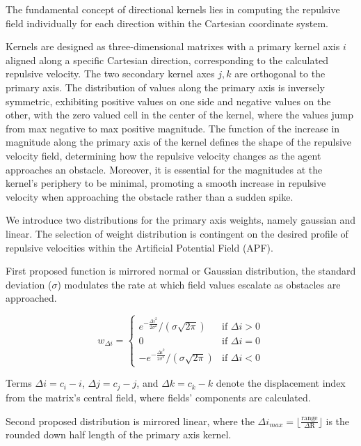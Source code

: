 \documentclass[letterpaper, 10 pt, conference]{ieeeconf}  %
\begin{document}
The fundamental concept of directional kernels lies in computing the repulsive field individually for each direction within the Cartesian coordinate system. 

Kernels are designed as three-dimensional matrixes with a primary kernel axis $i$ aligned along a specific Cartesian direction, corresponding to the calculated repulsive velocity. The two secondary kernel axes $j,k$ are orthogonal to the primary axis. The distribution of values along the primary axis is inversely symmetric, exhibiting positive values on one side and negative values on the other, with the zero valued cell in the center of the kernel, where the values jump from max negative to max positive magnitude. The function of the increase in magnitude along the primary axis of the kernel defines the shape of the repulsive velocity field, determining how the repulsive velocity changes as the agent approaches an obstacle. Moreover, it is essential for the magnitudes at the kernel's periphery to be minimal, promoting a smooth increase in repulsive velocity when approaching the obstacle rather than a sudden spike.

We introduce two distributions for the primary axis weights, namely gaussian and linear. The selection of weight distribution is contingent on the desired profile of repulsive velocities within the Artificial Potential Field (APF).

First proposed function is mirrored normal or Gaussian distribution, the standard deviation (\(\sigma\)) modulates the rate at which field values escalate as obstacles are approached.

\begin{equation}
w_{\Delta i} = 
\begin{cases} 
	e^{-\frac{\Delta i^2}{2\sigma^2}} / (\sigma \sqrt{2\pi}) & \text{if } \Delta i > 0 \\
	0 & \text{if } \Delta i = 0 \\
	-e^{-\frac{\Delta i^2}{2\sigma^2}} / (\sigma \sqrt{2\pi}) & \text{if } \Delta i < 0 
\end{cases}
\end{equation}

Terms \(\Delta i = c_i - i\), \(\Delta j = c_j - j\), and \(\Delta k = c_k - k\) denote the displacement index from the matrix's central field, where fields' components are calculated.

Second proposed distribution is mirrored linear, where the $\Delta i_{max} = \lfloor \frac{\mathrm{range}}{\Delta \mathrm{R}} \rfloor$ is the rounded down half length of the primary axis kernel. 
\end{document}
